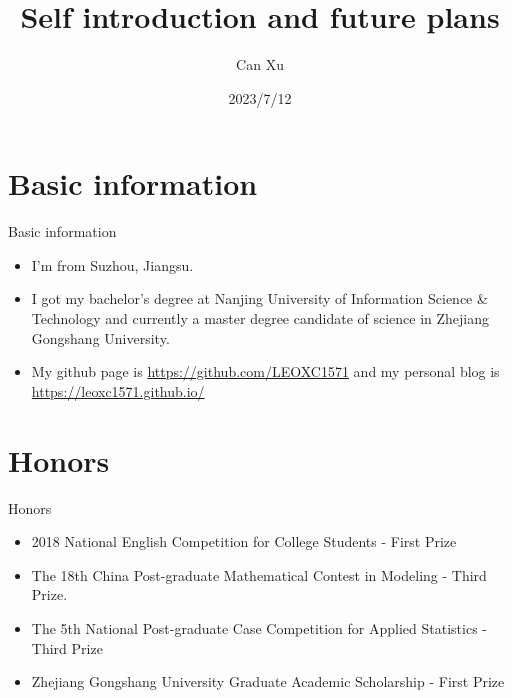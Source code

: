 \documentclass{beamer}
\author{Can Xu}
\title{Self introduction and future plans}
\subtitle{}
\institute{}
\date{2023/7/12}
\begin{document}
\kaishu
\begin{frame}
    \titlepage
    \centering{}
\end{frame}

\begin{frame}
    \tableofcontents[sectionstyle=show,subsectionstyle=show/shaded/hide,subsubsectionstyle=show/shaded/hide]
\end{frame}

\section{Basic information}
\begin{frame}{Basic information}
    \begin{itemize}
        \item I'm from Suzhou, Jiangsu.
        \item I got my bachelor's degree at Nanjing University of Information Science \& Technology and currently a master degree candidate of science in Zhejiang Gongshang University.
        \item My github page is \url{https://github.com/LEOXC1571} and my personal blog is \url{https://leoxc1571.github.io/}
    \end{itemize}
\end{frame}

\section{Honors}
\begin{frame}{Honors}
    \begin{itemize}
        \item 2018 National English Competition for College Students - First Prize
        \item The 18th China Post-graduate Mathematical Contest in Modeling - Third Prize.
        \item The 5th National Post-graduate Case Competition for Applied Statistics - Third Prize
        \item Zhejiang Gongshang University Graduate Academic Scholarship - First Prize
    \end{itemize}
\end{frame}
\end{document}
